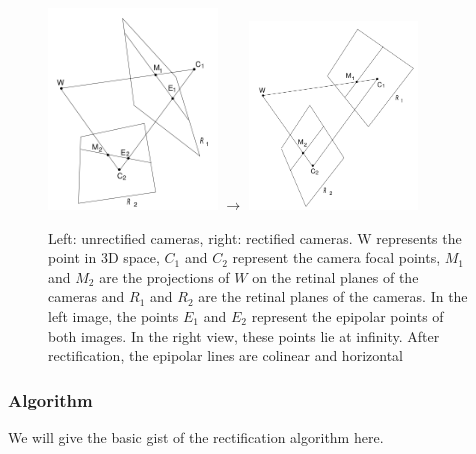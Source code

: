 \documentclass[a4paper]{article}
\begin{document}
\begin{figure}[h!]
\centering
\includegraphics[width=0.4\textwidth]{nonrectepipole}
$\rightarrow$
\includegraphics[width=0.4\textwidth]{rectepipole}
\caption{Left: unrectified cameras, right: rectified cameras. W represents the
point in 3D space, $C_1$ and $C_2$ represent the camera focal points, $M_1$ and
$M_2$ are the projections of $W$ on the retinal planes of the cameras and $R_1$
and $R_2$ are the retinal planes of the cameras. In the left image, the points
$E_1$ and $E_2$ represent the epipolar points of both images. In the right view,
these points lie at infinity. After rectification, the epipolar lines are colinear and horizontal}
\label{fig:rectepipole} \end{figure}

\subsubsection{Algorithm}
We will give the basic gist of the rectification algorithm here. 
\end{document}
